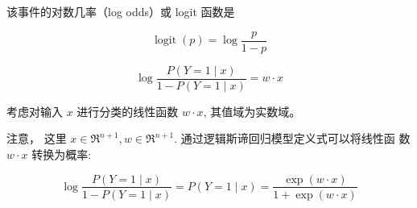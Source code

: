 该事件的对数几率（log odds）或 logit 函数是

\begin{equation} \operatorname{logit}(p)=\log \frac{p}{1-p} \end{equation}

\begin{equation} \log \frac{P(Y=1 \mid x)}{1-P(Y=1 \mid x)}=w \cdot x \end{equation}

考虑对输入 $ x $ 进行分类的线性函数 $ w \cdot x $, 其值域为实数域。

注意， 这里 $ x \in \mathfrak{R}^{n+1}, w \in \mathfrak{R}^{n+1} $. 通过逻辑斯谛回归模型定义式可以将线性函 数 $ w \cdot x $ 转换为概率:

\begin{equation}\log \frac{P(Y=1 \mid x)}{1-P(Y=1 \mid x)}= P(Y=1 \mid x)=\frac{\exp (w \cdot x)}{1+\exp (w \cdot x)} \end{equation}
